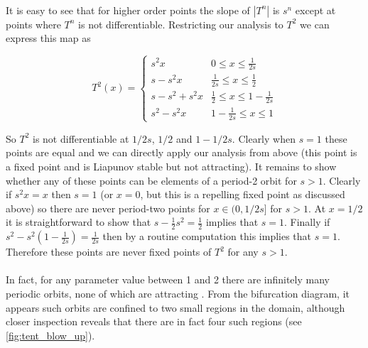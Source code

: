 \documentclass{article}
\begin{document}
\paragraph{}
It is easy to see that for higher order points the slope of $|T^n|$ is $s^n$ except at points where 
$T^n$ is not differentiable. Restricting our analysis to $T^2$ we can express this map as 

\begin{equation*}
    T^2(x) = 
    \begin{cases}
        s^2x & 0 \leq x \leq \frac{1}{2s} \\
        s-s^2x & \frac{1}{2s} \leq x \leq \frac{1}{2} \\
        s-s^2 + s^2x & \frac{1}{2} \leq x \leq 1 - \frac{1}{2s} \\
        s^2-s^2x & 1 - \frac{1}{2s} \leq x \leq 1
    \end{cases}
\end{equation*}

So $T^2$ is not differentiable at $1/2s$, $1/2$ and $1-1/2s$. Clearly when $s=1$ these points are 
equal and we can directly apply our analysis from above (this point is a fixed point and is Liapunov 
stable but not attracting). It remains to show whether any of these points can be elements of a 
period-2 orbit for $s > 1$. Clearly if $s^2x = x$ then $s =1$ (or $x = 0$, but this is a repelling 
fixed point as discussed above) so there are never period-two points 
for $x \in (0,1/2s]$ for $ s> 1$. At $ x = 1/2$ it is straightforward to show that $s- \frac{1}{2}s^2 = \frac{1}{2}$ 
implies that $ s= 1$. Finally if $s^2 - s^2\left(1 - \frac{1}{2s} \right) = \frac{1}{2s}$ then 
by a routine computation this implies that $ s= 1$. Therefore these points are never fixed points of 
$T^2$ for any $s > 1$.

\paragraph{}
In fact, for any 
parameter value between 1 and 2 there are infinitely many periodic orbits, none of which are 
attracting \cite{may_bifn}. From the bifurcation diagram, it appears such orbits are confined 
to two small regions in the domain, although closer inspection reveals that there are in fact 
four such regions (see \autoref{fig:tent_blow_up}).
\end{document}
